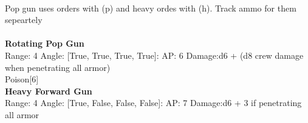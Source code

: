 \ \\
Pop gun uses orders with (p) and heavy ordes with (h). Track ammo for them sepeartely\\ 

\ \\
{\bf Rotating Pop Gun } \\



Range: 4  Angle: [True, True, True, True]: AP: 6 Damage:d6 + (d8 crew damage when penetrating all armor) \\
Poison[6]\\ 




{\bf Heavy Forward Gun } \\



Range: 4  Angle: [True, False, False, False]: AP: 7 Damage:d6 + 3 if penetrating all armor \\




 
\ \\



